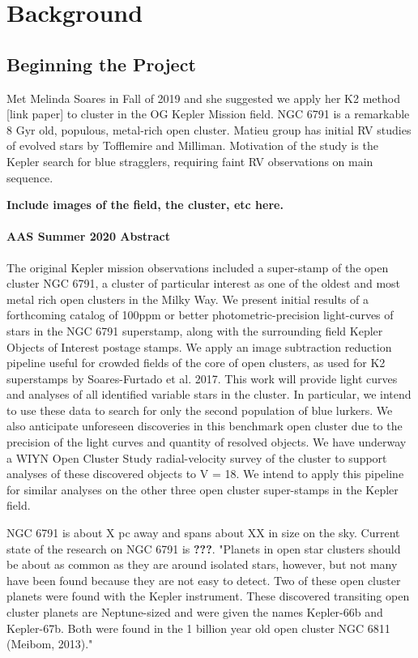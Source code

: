 \chapter*{Background}
\section*{Beginning the Project}
 Met Melinda Soares in Fall of 2019 and she suggested we apply her K2 method [link paper] to cluster in the OG Kepler Mission field. NGC 6791 is a remarkable 8 Gyr old, populous, metal-rich open cluster. Matieu group has initial RV studies of evolved stars by Tofflemire and Milliman. Motivation of the study is the Kepler search for blue stragglers, requiring faint RV observations on main sequence. 

 \textbf{Include images of the field, the cluster, etc here.}

\subsubsection{AAS Summer 2020 Abstract}
 The original Kepler mission observations included a super-stamp of the open cluster NGC 6791, a cluster of particular interest as one of the oldest and most metal rich open clusters in the Milky Way. We present initial results of a forthcoming catalog of 100ppm or better photometric-precision light-curves of stars in the NGC 6791 superstamp, along with the surrounding field Kepler Objects of Interest postage stamps.  We apply an image subtraction reduction pipeline useful for crowded fields of the core of open clusters, as used for K2 superstamps by Soares-Furtado et al. 2017. This work will provide light curves and analyses of all identified variable stars in the cluster. In particular, we intend to use these data to search for only the second population of blue lurkers.  We also anticipate unforeseen discoveries in this benchmark open cluster due to the precision of the light curves and quantity of resolved objects.  We have underway a WIYN Open Cluster Study radial-velocity survey of the cluster to support analyses of these discovered objects to V = 18. We intend to apply this pipeline for similar analyses on the other three open cluster super-stamps in the Kepler field.

 NGC 6791 is about X pc away and spans about XX in size on the sky. Current state of the research on NGC 6791 is \textbf{???}.
 "Planets in open star clusters should be about as common as they are around isolated stars, however, but not many have been found because they are not easy to detect. Two of these open cluster planets were found with the Kepler instrument. These discovered transiting open cluster planets are Neptune-sized and were given the names Kepler-66b and Kepler-67b. Both were found in the 1 billion year old open cluster NGC 6811 (Meibom, 2013)."  \\ \\ 

